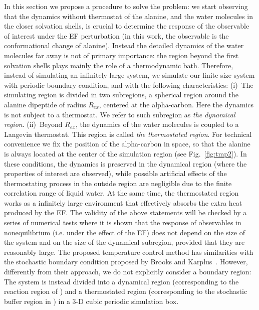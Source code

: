 \documentclass[journal=jctcce,manuscript=manuscript]{achemso}
\begin{document}
In this section we propose a procedure to solve the problem: we
start observing that the dynamics without thermostat of the alanine, 
and the water molecules in the closer solvation shells, is
crucial to determine the response of the observable of interest
under the EF perturbation
(in this work, the observable is the conformational change of alanine).
Instead the detailed dynamics of
the water molecules far away is not of primary importance: the region beyond the first solvation shells plays mainly the role of a thermodynamic bath. 
Therefore, instead of simulating an infinitely
large system, we simulate our finite size system with periodic
boundary condition, and with the following characteristics:
(i)~The simulating region is divided in two
subregions, a spherical region around the alanine dipeptide of radius $R_{ex}$,
centered at the alpha-carbon. Here the dynamics is
not subject to a thermostat.
We refer to such subregion as \emph{the  dynamical
region}. (ii)~Beyond $R_{ex}$, the dynamics of the water molecules is coupled
to a Langevin thermostat.  This region is called \emph{the thermostated
region}. For technical convenience we
fix the position of the alpha-carbon in space, so that the alanine is always
located at the center of the simulation region (see Fig.~\ref{fig:tmp2}).
In these conditions, the  dynamics is preserved in the dynamical region (where the properties of interest are observed), while 
possible artificial effects of the thermostating process in the outside region
are negligible due to the finite correlation
range of liquid water.
At the same time, the thermostated region works as a infinitely large
environment that effectively absorbs the extra heat produced by the EF.
The validity of the above
statements will be checked by a series of numerical tests where it is shown that
the response of observables in nonequilibrium (i.e. under the effect of the EF) does not depend on the size of the system
and on the size of the  dynamical subregion, provided that they are
reasonably large.
{ The proposed temperature control method has similarities with 
  the stochastic boundary condition proposed by Brooks and Karplus~\cite{brooks1983deformable}.
  However, differently from their approach, we do not explicitly consider a boundary region: The system is instead divided into a dynamical region (corresponding to the reaction region of \cite{brooks1983deformable}) and
  a thermostated region (corresponding to the stochastic buffer region in \cite{brooks1983deformable}) in a 3-D cubic periodic simulation box.
} 
\end{document}
